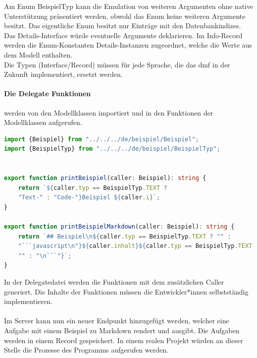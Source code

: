 \documentclass[./einleitung.tex]{subfiles}
\begin{document}
    Am Enum BeispielTyp kann die Emulation von weiteren Argumenten ohne native Unterstützung präsentiert werden, obwohl das Enum keine weiteren Argumente besitzt.
    Das eigentliche Enum besitzt nur Einträge mit den Datenbankindizes.
    Das Details-Interface würde eventuelle Argumente deklarieren.
    Im Info-Record werden die Enum-Konstanten Details-Instanzen zugeordnet, welche die Werte aus dem Modell enthalten.\\
    Die Typen (Interface/Record) müssen für jede Sprache, die das \acrshort{dmf} in der Zukunft implementiert, ersetzt werden.
    
    \paragraph{Die Delegate Funktionen} werden von den Modellklassen importiert und in den Funktionen der Modellklassen aufgerufen.
    \begin{lstlisting}[language=Typescript, caption=BeispielDelegate.ts, label=lst:beispielDelegateTs]
import {Beispiel} from "../../../de/beispiel/Beispiel";
import {BeispielTyp} from "../../../de/beispiel/BeispielTyp";


export function printBeispiel(caller: Beispiel): string {
    return `${caller.typ == BeispielTyp.TEXT ?
    "Text-" : "Code-"}Beispiel ${caller.i}`;
}

export function printBeispielMarkdown(caller: Beispiel): string {
    return `## Beispiel\n${caller.typ == BeispielTyp.TEXT ? "" :
    "```javascript\n"}${caller.inhalt}${caller.typ == BeispielTyp.TEXT ?
    "" : "\n```"}`;
}
    \end{lstlisting}
    In der Delegatedatei werden die Funktionen mit dem zusätzlichen Caller generiert.
    Die Inhalte der Funktionen müssen die Entwickler*innen selbstständig implementieren.
    \\\\
    Im Server kann nun ein neuer Endpunkt hinzugefügt werden, welcher eine Aufgabe mit einem Beispiel zu Markdown rendert und ausgibt.
    Die Aufgaben werden in einem Record gespeichert.
    In einem realen Projekt würden an dieser Stelle die Prozesse des Programms aufgerufen werden.
\end{document}
